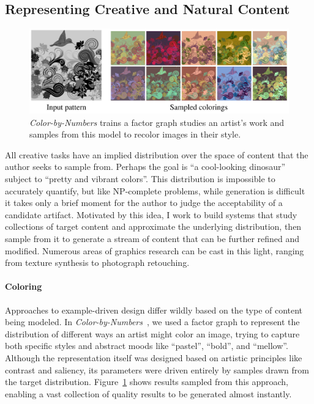 \documentclass[12pt, a4paper]{article}
\begin{document}
\begin{small}
\subsection*{Representing Creative and Natural Content}

\begin{figure}[b!!]
  \centering
    \includegraphics[width=\textwidth]{figColorSampling.png}
  \caption{\textit{Color-by-Numbers} trains a factor graph studies an artist's work and samples from this model to recolor images in their style.}
  \label{fig:colorSampling}  
\end{figure}

All creative tasks have an implied distribution over the space of content that the author seeks to sample from. Perhaps the goal is ``a cool-looking dinosaur'' subject to ``pretty and vibrant colors''. This distribution is impossible to accurately quantify, but like NP-complete problems, while generation is difficult it takes only a brief moment for the author to judge the acceptability of a candidate artifact. Motivated by this idea, I work to build systems that study collections of target content and  approximate the underlying distribution, then sample from it to generate a stream of content that can be further refined and modified. Numerous areas of graphics research can be cast in this light, ranging from texture synthesis to photograph retouching.

\paragraph{Coloring} Approaches to example-driven design differ wildly based on the type of content being modeled. In \emph{Color-by-Numbers}~\cite{colorByNumbers}, we used a factor graph to represent the distribution of different ways an artist might color an image, trying to capture both specific styles and abstract moods like ``pastel'', ``bold'', and ``mellow''. Although the representation itself was designed based on artistic principles like contrast and saliency, its parameters were driven entirely by samples drawn from the target distribution. Figure~\ref{fig:colorSampling} shows results sampled from this approach, enabling a vast collection of quality results to be generated almost instantly.


\end{small}
\end{document}
